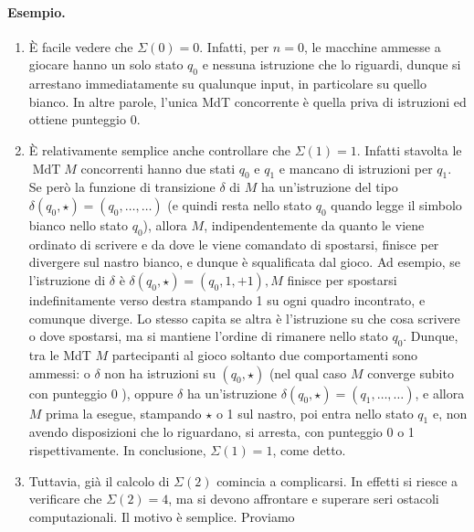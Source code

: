 \paragraph{Esempio.}
\begin{enumerate}
    \item È facile vedere che $\Sigma(0)=0$. Infatti, per $n=0$, le macchine ammesse
          a giocare hanno un solo stato $q_0$ e nessuna istruzione che lo riguardi,
          dunque si arrestano immediatamente su qualunque input, in particolare su
          quello bianco. In altre parole, l'unica MdT concorrente è quella priva di
          istruzioni ed ottiene punteggio 0.
    \item È relativamente semplice anche controllare che $\Sigma(1)=1$. Infatti
          stavolta le $\operatorname{MdT} M$ concorrenti hanno due stati $q_0$ e
          $q_1$ e mancano di istruzioni per $q_1$. Se però la funzione di transizione
          $\delta$ di $M$ ha un'istruzione del tipo $\delta\left(q_0,
              \star\right)=\left(q_0, \ldots, \ldots\right)$ (e quindi resta nello stato
          $q_0$ quando legge il simbolo bianco nello stato $q_0$), allora $M$,
          indipendentemente da quanto le viene ordinato di scrivere e da dove le
          viene comandato di spostarsi, finisce per divergere sul nastro bianco, e
          dunque è squalificata dal gioco. Ad esempio, se l'istruzione di $\delta$ è
          $\delta\left(q_0, \star\right)=\left(q_0, 1,+1\right), M$ finisce per
          spostarsi indefinitamente verso destra stampando 1 su ogni quadro
          incontrato, e comunque diverge. Lo stesso capita se altra è l'istruzione su
          che cosa scrivere o dove spostarsi, ma si mantiene l'ordine di rimanere
          nello stato $q_0$. Dunque, tra le MdT $M$ partecipanti al gioco soltanto
          due comportamenti sono ammessi: o $\delta$ non ha istruzioni su $\left(q_0,
              \star\right)$ (nel qual caso $M$ converge subito con punteggio 0 ), oppure
          $\delta$ ha un'istruzione $\delta\left(q_0, \star\right)=\left(q_1, \ldots,
              \ldots\right)$, e allora $M$ prima la esegue, stampando $\star$ o
          1 sul nastro, poi entra nello stato $q_1$ e, non avendo
          disposizioni che lo riguardano, si arresta, con punteggio 0 o 1
          rispettivamente. In conclusione, $\Sigma(1)=1$, come detto.
    \item Tuttavia, già il calcolo di $\Sigma(2)$ comincia a complicarsi. In effetti
          si riesce a verificare che $\Sigma(2)=4$, ma si devono affrontare e
          superare seri ostacoli computazionali. Il motivo è semplice. Proviamo

\end{enumerate}

